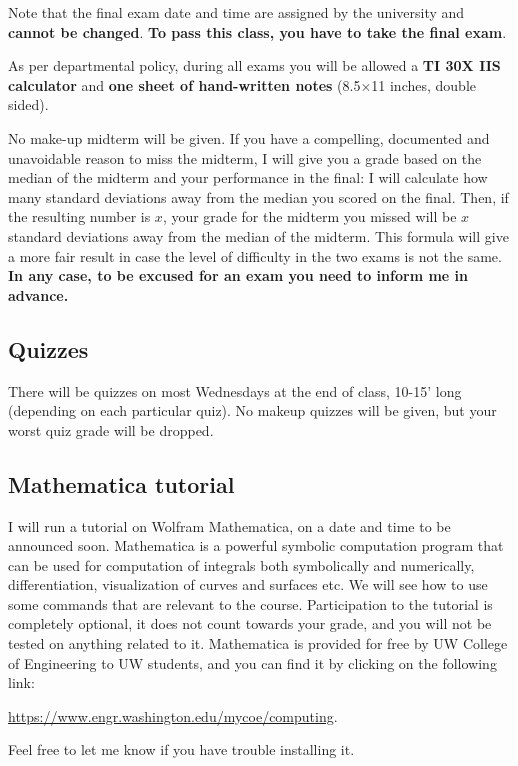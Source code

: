 \documentclass[11pt]{article}
\begin{document}
Note that the final exam date and time are assigned by the university and \textbf{cannot be changed}. \textbf{To pass this class, you have to take the final exam}.

\vspace{0.1 in}

As per departmental policy, during all exams you will be allowed a \textbf{TI 30X IIS calculator} and \textbf{one sheet of hand-written notes} (8.5$\times$11 inches, double sided).
\vspace{0.1 in}


No make-up midterm will be given. If you have a compelling, documented and unavoidable reason to miss the midterm, I will give you a grade based on the median of the midterm and your performance in the final: I will calculate how many standard deviations away from the median you scored on the final. Then, if the resulting number is $x$, your grade for the midterm you missed will be $x$ standard deviations away from the median of the midterm. This formula will give a more fair result in case the level of difficulty in the two exams is not the same. \textbf{In any case, to be excused for an exam you need to inform me in advance.}

\subsection*{Quizzes}
There will be quizzes on most Wednesdays at the end of class, 10-15' long (depending on each particular quiz). No makeup quizzes will be given, but your worst quiz grade will be dropped.



 \vspace{1mm}
 \subsection*{Mathematica tutorial}


I will run a tutorial on Wolfram Mathematica, on a date and time to be announced soon. Mathematica is a powerful symbolic computation program that can be used for computation of integrals both symbolically and numerically, differentiation, visualization of curves and surfaces etc. We will see how to use some commands that are relevant to the course. Participation to the tutorial is completely optional, it does not count towards your grade, and you will not be tested on anything related to it. Mathematica is provided for free by UW College of Engineering to UW students, and you can find it by clicking on the following link: \begin{center}\href{https://www.engr.washington.edu/mycoe/computing/software/install_mathematica}{https://www.engr.washington.edu/mycoe/computing}.\end{center} Feel free to let me know if you have trouble installing it.
\end{document}
